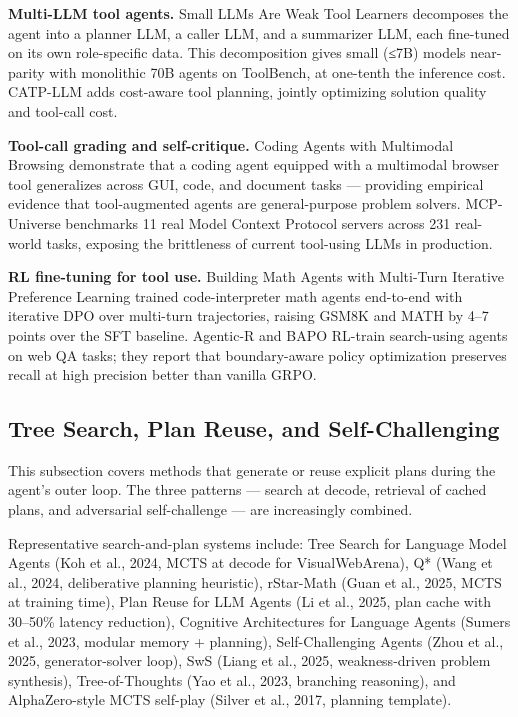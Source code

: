 \documentclass{article}
\begin{document}
\textbf{Multi-LLM tool agents.} Small LLMs Are Weak Tool Learners \citep{shen20242024} decomposes the agent into a planner LLM, a caller LLM, and a summarizer LLM, each fine-tuned on its own role-specific data. This decomposition gives small (≤7B) models near-parity with monolithic 70B agents on ToolBench, at one-tenth the inference cost. CATP-LLM \citep{wu20242024} adds cost-aware tool planning, jointly optimizing solution quality and tool-call cost.

\textbf{Tool-call grading and self-critique.} Coding Agents with Multimodal Browsing \citep{soni20252025} demonstrate that a coding agent equipped with a multimodal browser tool generalizes across GUI, code, and document tasks --- providing empirical evidence that tool-augmented agents are general-purpose problem solvers. MCP-Universe \citep{luo20252025} benchmarks 11 real Model Context Protocol servers across 231 real-world tasks, exposing the brittleness of current tool-using LLMs in production.

\textbf{RL fine-tuning for tool use.} Building Math Agents with Multi-Turn Iterative Preference Learning \citep{xiong20242024} trained code-interpreter math agents end-to-end with iterative DPO over multi-turn trajectories, raising GSM8K and MATH by 4--7 points over the SFT baseline. Agentic-R \citep{liu20262026} and BAPO \citep{liu20262026} RL-train search-using agents on web QA tasks; they report that boundary-aware policy optimization preserves recall at high precision better than vanilla GRPO.

\subsection{Tree Search, Plan Reuse, and Self-Challenging}\label{tree-search-plan-reuse-and-self-challenging}

This subsection covers methods that generate or reuse explicit plans during the agent's outer loop. The three patterns --- search at decode, retrieval of cached plans, and adversarial self-challenge --- are increasingly combined.

Representative search-and-plan systems include: Tree Search for Language Model Agents (Koh et al., 2024, MCTS at decode for VisualWebArena), Q* (Wang et al., 2024, deliberative planning heuristic), rStar-Math (Guan et al., 2025, MCTS at training time), Plan Reuse for LLM Agents (Li et al., 2025, plan cache with 30--50\% latency reduction), Cognitive Architectures for Language Agents (Sumers et al., 2023, modular memory + planning), Self-Challenging Agents (Zhou et al., 2025, generator-solver loop), SwS (Liang et al., 2025, weakness-driven problem synthesis), Tree-of-Thoughts (Yao et al., 2023, branching reasoning), and AlphaZero-style MCTS self-play (Silver et al., 2017, planning template).
\end{document}
